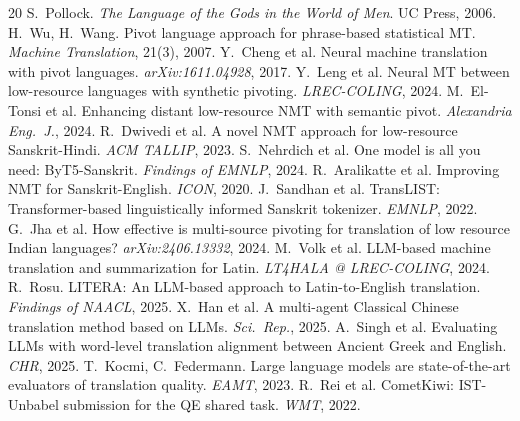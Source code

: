 \documentclass[10pt,twocolumn]{article}
\begin{document}
\vspace{-0.5em}
{\scriptsize

\begin{thebibliography}{20}
\setlength{\itemsep}{-1pt}
 S.~Pollock. \emph{The Language of the Gods in the World of Men}. UC Press, 2006.
 H.~Wu, H.~Wang. Pivot language approach for phrase-based statistical MT. \emph{Machine Translation}, 21(3), 2007.
 Y.~Cheng et al. Neural machine translation with pivot languages. \emph{arXiv:1611.04928}, 2017.
 Y.~Leng et al. Neural MT between low-resource languages with synthetic pivoting. \emph{LREC-COLING}, 2024.
 M.~El-Tonsi et al. Enhancing distant low-resource NMT with semantic pivot. \emph{Alexandria Eng.\ J.}, 2024.
 R.~Dwivedi et al. A novel NMT approach for low-resource Sanskrit-Hindi. \emph{ACM TALLIP}, 2023.
 S.~Nehrdich et al. One model is all you need: ByT5-Sanskrit. \emph{Findings of EMNLP}, 2024.
 R.~Aralikatte et al. Improving NMT for Sanskrit-English. \emph{ICON}, 2020.
 J.~Sandhan et al. TransLIST: Transformer-based linguistically informed Sanskrit tokenizer. \emph{EMNLP}, 2022.
 G.~Jha et al. How effective is multi-source pivoting for translation of low resource Indian languages? \emph{arXiv:2406.13332}, 2024.
 M.~Volk et al. LLM-based machine translation and summarization for Latin. \emph{LT4HALA @ LREC-COLING}, 2024.
 R.~Rosu. LITERA: An LLM-based approach to Latin-to-English translation. \emph{Findings of NAACL}, 2025.
 X.~Han et al. A multi-agent Classical Chinese translation method based on LLMs. \emph{Sci.\ Rep.}, 2025.
 A.~Singh et al. Evaluating LLMs with word-level translation alignment between Ancient Greek and English. \emph{CHR}, 2025.
 T.~Kocmi, C.~Federmann. Large language models are state-of-the-art evaluators of translation quality. \emph{EAMT}, 2023.
 R.~Rei et al. CometKiwi: IST-Unbabel submission for the QE shared task. \emph{WMT}, 2022.
\end{thebibliography}
}
\end{document}
